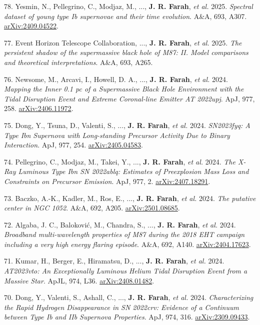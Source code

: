 \documentclass[margin,line]{res}
\newcommand{\apj}{ApJ}                    %
\newcommand{\apjl}{ApJL}                  %
\newcommand{\aap}{A\&A}                   %
\begin{document}
\begin{resume}
78. Yesmin, N., Pellegrino, C., Modjaz, M., ..., \textbf{J. R. Farah}, \textit{et al.} 2025. \textit{Spectral dataset of young type Ib supernovae and their time evolution}. \aap, 693, A307. \href{https://arxiv.org/abs/2409.04522}{arXiv:2409.04522}.

77. Event Horizon Telescope Collaboration, ..., \textbf{J. R. Farah}, \textit{et al.} 2025. \textit{The persistent shadow of the supermassive black hole of M87: II. Model comparisons and theoretical interpretations}. \aap, 693, A265.

76. Newsome, M., Arcavi, I., Howell, D. A., ..., \textbf{J. R. Farah}, \textit{et al.} 2024. \textit{Mapping the Inner 0.1 pc of a Supermassive Black Hole Environment with the Tidal Disruption Event and Extreme Coronal-line Emitter AT 2022upj}. \apj, 977, 258. \href{https://arxiv.org/abs/2406.11972}{arXiv:2406.11972}.

75. Dong, Y., Tsuna, D., Valenti, S., ..., \textbf{J. R. Farah}, \textit{et al.} 2024. \textit{SN2023fyq: A Type Ibn Supernova with Long-standing Precursor Activity Due to Binary Interaction}. \apj, 977, 254. \href{https://arxiv.org/abs/2405.04583}{arXiv:2405.04583}.

74. Pellegrino, C., Modjaz, M., Takei, Y., ..., \textbf{J. R. Farah}, \textit{et al.} 2024. \textit{The X-Ray Luminous Type Ibn SN 2022ablq: Estimates of Preexplosion Mass Loss and Constraints on Precursor Emission}. \apj, 977, 2. \href{https://arxiv.org/abs/2407.18291}{arXiv:2407.18291}.

73. Baczko, A.-K., Kadler, M., Ros, E., ..., \textbf{J. R. Farah}, \textit{et al.} 2024. \textit{The putative center in NGC 1052}. \aap, 692, A205. \href{https://arxiv.org/abs/2501.08685}{arXiv:2501.08685}.

72. Algaba, J. C., Balokovi{\'c}, M., Chandra, S., ..., \textbf{J. R. Farah}, \textit{et al.} 2024. \textit{Broadband multi-wavelength properties of M87 during the 2018 EHT campaign including a very high energy flaring episode}. \aap, 692, A140. \href{https://arxiv.org/abs/2404.17623}{arXiv:2404.17623}.

71. Kumar, H., Berger, E., Hiramatsu, D., ..., \textbf{J. R. Farah}, \textit{et al.} 2024. \textit{AT2023vto: An Exceptionally Luminous Helium Tidal Disruption Event from a Massive Star}. \apjl, 974, L36. \href{https://arxiv.org/abs/2408.01482}{arXiv:2408.01482}.

70. Dong, Y., Valenti, S., Ashall, C., ..., \textbf{J. R. Farah}, \textit{et al.} 2024. \textit{Characterizing the Rapid Hydrogen Disappearance in SN 2022crv: Evidence of a Continuum between Type Ib and IIb Supernova Properties}. \apj, 974, 316. \href{https://arxiv.org/abs/2309.09433}{arXiv:2309.09433}.


\end{resume}
\end{document}
